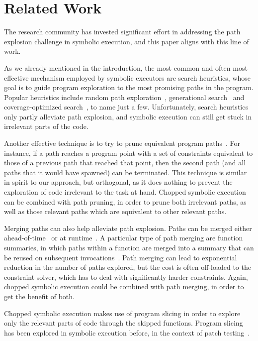 
\chapter{Related Work}\label{chapter:related}

The research community has invested significant effort in addressing
the path explosion challenge in symbolic execution, and this paper
aligns with this line of work.

As we already mentioned in the introduction, the most common and often
most effective mechanism employed by symbolic executors are search
heuristics, whose goal is to guide program exploration to the most
promising paths in the program.  Popular heuristics include random
path exploration~\cite{klee}, generational search~\cite{sage} and
coverage-optimized search~\cite{exe,sen:concolicheuristics}, to name
just a few.  Unfortunately, search heuristics only partly alleviate
path explosion, and symbolic execution can still get stuck in
irrelevant parts of the code.

Another effective technique is to try to prune equivalent program
paths~\cite{exe:tacas,rwset2}.  For instance, if a path reaches a
program point with a set of constraints equivalent to those of a
previous path that reached that point, then the second path (and all
paths that it would have spawned) can be terminated.  This technique
is similar in spirit to our approach, but orthogonal, as it does
nothing to prevent the exploration of code irrelevant to the task at
hand.  Chopped symbolic execution can be combined with path pruning,
in order to prune both irrelevant paths, as well as those relevant
paths which are equivalent to other relevant paths.

Merging paths can also help alleviate path explosion.  Paths can be
merged either ahead-of-time~\cite{klee-fp,kleecl:tse} or at
runtime~\cite{merging:pldi12,multise:fse15}. A particular type of path
merging are function summaries, in which paths within a function are
merged into a summary that can be reused on subsequent
invocations~\cite{godefroid:popl,godefroid:tacas}. Path merging can
lead to exponential reduction in the number of paths explored, but the
cost is often off-loaded to the constraint solver, which has to deal
with significantly harder constraints.  Again, chopped symbolic
execution could be combined with path merging, in order to get the
benefit of both.

Chopped symbolic execution makes use of program slicing in order to
explore only the relevant parts of code through the skipped functions.
Program slicing has been explored in symbolic execution before, \eg in
the context of patch testing~\cite{babic11}.


